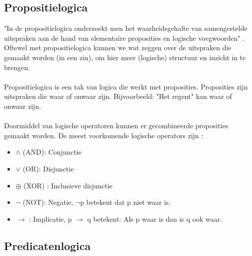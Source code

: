 \documentclass{article}
\begin{document}
  \subsection{Propositielogica}
    "In de propositielogica onderzoekt men het waarheidsgehalte van samengestelde uitspraken aan de hand van elementaire proposities en logische voegwoorden" \cite{oeleLogica}. Oftewel met propositielogica kunnen we wat zeggen over de uitspraken die gemaakt worden (in een zin), om hier meer (logische) structuur en inzicht in te brengen. \\\\
    Propositielogica is een tak van logica die werkt met proposities. Proposities zijn uitspraken die waar of onwaar zijn. Bijvoorbeeld: "Het regent" kan waar of onwaar zijn. \\\\ Doormiddel van logische operatoren kunnen er gecombineerde proposities gemaakt worden. De meest voorkomende logische operators zijn \cite{schaumsOutline}:
    \begin{itemize}
      \item $\wedge$ (AND): Conjunctie
      \item  $\vee$ (OR): Disjunctie
      \item  $\oplus$ (XOR) : Inclusieve disjunctie
      \item  $\lnot$ (NOT): Negatie, $\lnot$p betekent dat p niet waar is.
      \item  $\to$ : Implicatie, p $\to$ q betekent: Als p waar is dan is q ook waar.
    \end{itemize}

  \subsection{Predicatenlogica}
\end{document}
